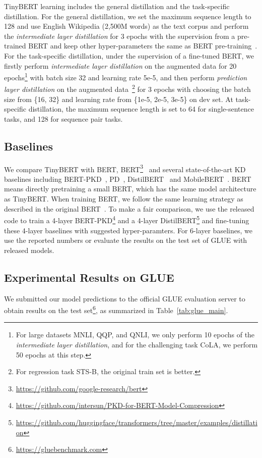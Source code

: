 \documentclass[11pt,a4paper]{article}
\begin{document}
TinyBERT learning includes the general distillation and the task-specific distillation. For the general distillation, we set  the maximum sequence length to 128 and use English Wikipedia (2,500M words) as the text corpus and perform the {\it intermediate layer distillation} for 3 epochs with the supervision from a pre-trained BERT and keep other hyper-parameters the same as BERT pre-training~\cite{devlin2019bert}. For the task-specific distillation, under the supervision of a fine-tuned BERT, we firstly perform {\it intermediate layer distillation} on the augmented data for 20 epochs\footnote{For large datasets MNLI, QQP, and QNLI, we only perform 10 epochs of the {\it intermediate layer distillation}, and for the challenging task CoLA, we perform 50 epochs at this step.} with batch size 32 and learning rate 5e-5, and then perform {\it prediction layer distillation} on the augmented data~\footnote{For regression task STS-B, the original train set is better.} for 3 epochs with choosing the batch size from \{16, 32\} and learning rate from \{1e-5, 2e-5, 3e-5\} on dev set. At task-specific distillation, the maximum sequence length is set to 64 for single-sentence tasks, and 128 for sequence pair tasks. 

\subsection{Baselines}\label{baselines}
We compare TinyBERT with BERT, BERT\footnote{\url{https://github.com/google-research/bert}}~\cite{turc2019well} and several state-of-the-art KD baselines including BERT-PKD~\cite{sun2019patient}, PD~\cite{turc2019well}, DistilBERT~\cite{sanh2019distilbert} and MobileBERT~\cite{sun2020mobilebert}. BERT means directly pretraining a small BERT, which has the same model architecture as TinyBERT. When training BERT, we follow the same learning strategy as described in the original BERT~\cite{devlin2019bert}. To make a fair comparison, we use the released code to train a 4-layer BERT-PKD\footnote{\url{https://github.com/intersun/PKD-for-BERT-Model-Compression}} and a 4-layer DistilBERT\footnote{\url{https://github.com/huggingface/transformers/tree/master/examples/distillation}} and fine-tuning these 4-layer baselines with suggested hyper-paramters. For 6-layer baselines, we use the reported numbers or evaluate the results on the test set of GLUE with released models.




\subsection{Experimental Results on GLUE}
We submitted our model predictions to the official GLUE evaluation server to obtain results on the test set\footnote{\url{https://gluebenchmark.com}}, as summarized in Table~\ref{tab:glue_main}.
\end{document}
